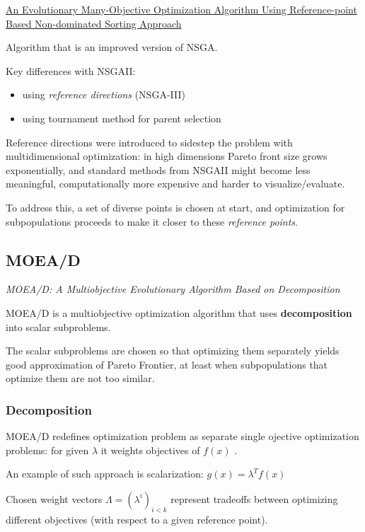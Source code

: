 \documentclass{article}
\begin{document}
\href{https://www.egr.msu.edu/~kdeb/papers/k2012009.pdf}{An Evolutionary Many-Objective Optimization Algorithm Using Reference-point Based Non-dominated Sorting Approach}

Algorithm that is an improved version of NSGA.

Key differences with NSGAII:

\begin{itemize}
\item using \textit{reference directions} (NSGA-III)
\item using tournament method for parent selection
\end{itemize}

Reference directions were introduced to sidestep the problem with multidimensional optimization: in high dimensions Pareto front size grows exponentially, and standard methods from NSGAII might become less meaningful, computationally more expensive and harder to visualize/evaluate.

To address this, a set of diverse points is chosen at start, and optimization for subpopulations proceeds to make it closer to these \textit{reference points}.

\subsection{MOEA/D}
\textit{MOEA/D: A Multiobjective Evolutionary Algorithm Based on Decomposition}

MOEA/D is a multiobjective optimization algorithm that uses \textbf{decomposition} into scalar subproblems.

The scalar subproblems are chosen so that optimizing them separately yields good approximation of Pareto Frontier, at least when subpopulations that optimize them are not too similar.

\subsubsection{Decomposition}

MOEA/D redefines optimization problem as separate single ojective optimization problems: for given $\lambda$ it weights objectives of $f(x)$ .

An example of such approach is scalarization: $g(x) = \lambda^T f(x)$

Chosen weight vectors $\Lambda = (\lambda^i)_{i < k}$ represent tradeoffs between optimizing different objectives (with respect to a given reference point).
\end{document}
